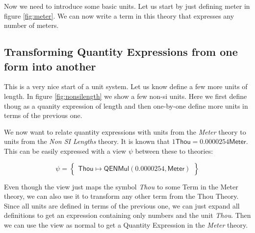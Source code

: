 Now we need to introduce some basic units. Let us start by just defining meter in figure \ref{fig:meter}. We can now write a term in this theory that expresses any number of meters.



\subsection{Transforming Quantity Expressions from one form into another}
\label{sec:qeconv}

This is a very nice start of a unit system. Let us know define a few more units of length. In figure \ref{fig:nonsilength} we show a few non-si units. Here we first define thoug as a quanity expression of length and then one-by-one define more units in terms of the previous one.


We now want to relate quantity expressions with units from the \textit{Meter} theory to units from the \textit{Non SI Lengths} theory. It is known that $1 \mathsf{Thou} = 0.0000254 \mathsf{Meter}$. This can be easily expressed with a view $\psi$ between these to theories:

\[
\psi = \left\{\begin{array}{l}
  \mathsf{Thou} \mapsto \mathsf{QENMul} \left( 0.0000254, \mathsf{Meter} \right)
\end{array}\right\}
\]

Even though the view just maps the symbol \textit{Thou} to some Term in the Meter theory, we can also use it to transform any other term from the Thou Theory. Since all units are defined in terms of the previous one, we can just expand all definitions to get an expression containing only numbers and the unit \textit{Thou}. Then we can use the view as normal to get a Quantity Expression in the \textit{Meter} theory.
